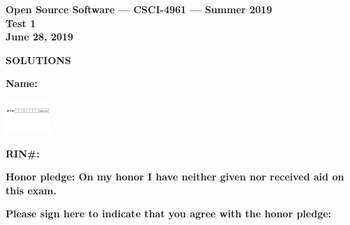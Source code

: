 \documentclass[10pt]{article}
\begin{document}
\thispagestyle{empty}

\vspace*{0.5in}

\begin{center}
\Large
\textbf{Open Source Software --- CSCI-4961 --- Summer 2019} \\
\textbf{Test 1} \\
\textbf{June 28, 2019}
\end{center}


\beginanswers
\begin{center}
\Large
\textbf{SOLUTIONS}
\end{center}

\else


\begin{center}

\textbf{\Large Name:} \underline {\hspace{2.0in}} \\

\bigskip
\bigskip

\centerline{
\includegraphics[height=0.5in]{boxes}
}


\bigskip

\textbf{\Large RIN\#:} \underline {\hspace{1.5in}}  

\vspace*{0.4in}
{\large\bf Honor pledge: On my honor I have neither given
nor received aid on this exam.}

\vspace*{0.1in}
{\large\bf Please sign here to indicate that you agree with the honor pledge: \underline {\hspace{1.5in}}}
\end{center}
\end{document}
